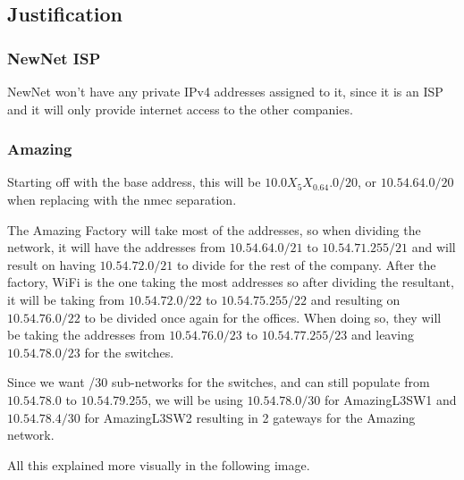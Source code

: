 \documentclass{report}
\begin{document}
\subsection*{Justification}

\subsubsection*{NewNet ISP}
NewNet won't have any private IPv4 addresses assigned to it, since it is an ISP and it will only provide internet access to the other companies.

\subsubsection*{Amazing}
Starting off with the base address, this will be $10.0X_5X_0.64.0/20$, or $10.54.64.0/20$ when replacing with the nmec separation.

The Amazing Factory will take most of the addresses, so when dividing the network, it will have the addresses from $10.54.64.0/21$ to $10.54.71.255/21$ and will result on having $10.54.72.0/21$ to divide for the rest of the company. After the factory, WiFi is the one taking the most addresses so after dividing the resultant, it will be taking from $10.54.72.0/22$ to $10.54.75.255/22$ and resulting on $10.54.76.0/22$ to be divided once again for the offices. When doing so, they will be taking the addresses from $10.54.76.0/23$ to $10.54.77.255/23$ and leaving $10.54.78.0/23$ for the switches.

Since we want /30 sub-networks for the switches, and can still populate from $10.54.78.0$ to $10.54.79.255$, we will be using $10.54.78.0/30$ for AmazingL3SW1 and $10.54.78.4/30$ for AmazingL3SW2 resulting in 2 gateways for the Amazing network.

All this explained more visually in the following image.
\end{document}
